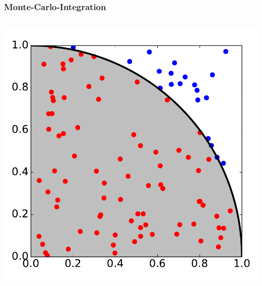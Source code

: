 \begin{frame}
    \frametitle{Monte-Carlo-Integration}
    \begin{columns}\begin{column}{0.35\linewidth}
        \centerline{\includegraphics[width=1.1\linewidth]{monte-carlo-pi-quarter-sphere.pdf}}

\end{column}
\end{columns}
\end{frame}

